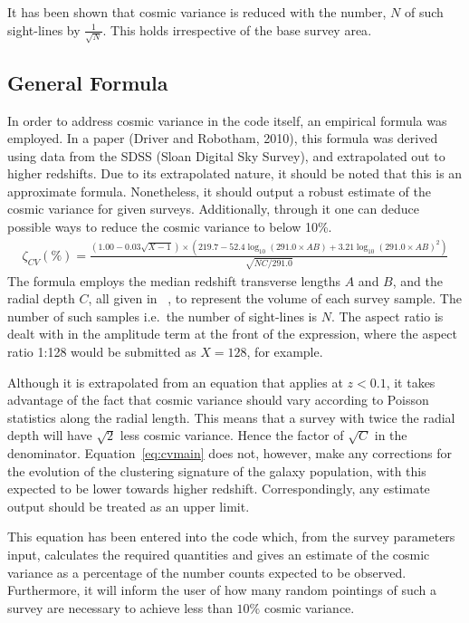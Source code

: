 			It has been shown that cosmic variance is reduced with the number, $N$ of such sight-lines by $\frac{1}{\sqrt{N}}$. This holds irrespective of the base survey area\cite{Driver01102010}.

	\subsection{General Formula} %
	\label{sub:general_formula}
		In order to address cosmic variance in the code itself, an empirical formula was employed. In a paper (Driver and Robotham, 2010), this formula was derived using data from the SDSS (Sloan Digital Sky Survey), and extrapolated out to higher redshifts\cite{Driver01102010}. Due to its extrapolated nature, it should be noted that this is an approximate formula. Nonetheless, it should output a robust estimate of the cosmic variance for given surveys. Additionally, through it one can deduce possible ways to reduce the cosmic variance to below 10\%.
		\begin{align}
			\zeta _{CV}(\%)=\frac{\left( 1.00-0.03\sqrt{X-1} \right)\times \left( 219.7-52.4\log_{10}\left(291.0\times AB \right) + 3.21\log_{10}{\left(291.0\times AB\right)}^{2} \right)}{\sqrt{NC/291.0}} \label{eq:cvmain}
		\end{align}
		The formula employs the median redshift transverse lengths $A$ and $B$, and the radial depth $C$, all given in \si{\mega\parsec}, to represent the volume of each survey sample. The number of such samples i.e.\ the number of sight-lines is $N$. The aspect ratio is dealt with in the amplitude term at the front of the expression, where the aspect ratio 1:128 would be submitted as $X=128$, for example.

		Although it is extrapolated from an equation that applies at $z<0.1$, it takes advantage of the fact that cosmic variance should vary according to Poisson statistics along the radial length. This means that a survey with twice the radial depth will have $\sqrt{2}$ less cosmic variance. Hence the factor of $\sqrt{C}$ in the denominator. Equation~\ref{eq:cvmain} does not, however, make any corrections for the evolution of the clustering signature of the galaxy population, with this expected to be lower towards higher redshift. Correspondingly, any estimate output should be treated as an upper limit.

		This equation has been entered into the code which, from the survey parameters input, calculates the required quantities and gives an estimate of the cosmic variance as a percentage of the number counts expected to be observed. Furthermore, it will inform the user of how many random pointings of such a survey are necessary to achieve less than $10\%$ cosmic variance.

